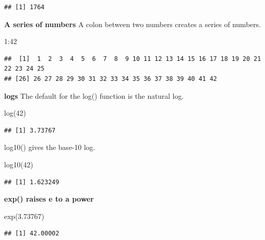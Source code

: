 \documentclass[
]{book}
\newenvironment{Shaded}{\begin{snugshade}}{\end{snugshade}}
\newcommand{\DecValTok}[1]{\textcolor[rgb]{0.00,0.00,0.81}{#1}}
\newcommand{\FloatTok}[1]{\textcolor[rgb]{0.00,0.00,0.81}{#1}}
\newcommand{\FunctionTok}[1]{\textcolor[rgb]{0.00,0.00,0.00}{#1}}
\newcommand{\NormalTok}[1]{#1}
\newcommand{\SpecialCharTok}[1]{\textcolor[rgb]{0.00,0.00,0.00}{#1}}
\begin{document}
\begin{verbatim}
## [1] 1764
\end{verbatim}

\textbf{A series of numbers}
A colon between two numbers creates a series of numbers.

\begin{Shaded}
\begin{Highlighting}[]
\DecValTok{1}\SpecialCharTok{:}\DecValTok{42}
\end{Highlighting}
\end{Shaded}

\begin{verbatim}
##  [1]  1  2  3  4  5  6  7  8  9 10 11 12 13 14 15 16 17 18 19 20 21 22 23 24 25
## [26] 26 27 28 29 30 31 32 33 34 35 36 37 38 39 40 41 42
\end{verbatim}

\textbf{logs}
The default for the log() function is the natural log.

\begin{Shaded}
\begin{Highlighting}[]
\FunctionTok{log}\NormalTok{(}\DecValTok{42}\NormalTok{)}
\end{Highlighting}
\end{Shaded}

\begin{verbatim}
## [1] 3.73767
\end{verbatim}

log10() gives the base-10 log.

\begin{Shaded}
\begin{Highlighting}[]
\FunctionTok{log10}\NormalTok{(}\DecValTok{42}\NormalTok{)}
\end{Highlighting}
\end{Shaded}

\begin{verbatim}
## [1] 1.623249
\end{verbatim}

\textbf{exp() raises e to a power}

\begin{Shaded}
\begin{Highlighting}[]
\FunctionTok{exp}\NormalTok{(}\FloatTok{3.73767}\NormalTok{)}
\end{Highlighting}
\end{Shaded}

\begin{verbatim}
## [1] 42.00002
\end{verbatim}
\end{document}
